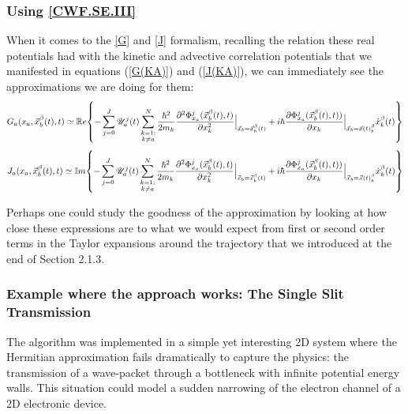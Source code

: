 \documentclass[11pt, a4paper]{article} %
\newcommand{\R}{\mathbb{R}} %
\newcommand{\U}{\mathscr{U}}
\begin{document}

\subsubsection{Using \ref{CWF.SE.III}}
When it comes to the \ref{G} and \ref{J} formalism, recalling the relation these real potentials had with the kinetic and advective correlation potentials that we manifested in equations (\ref{G(KA)}) and (\ref{J(KA)}), we can immediately see the approximations we are doing for them:
$$
G_a(x_a,\vec{x}_b^\beta(t),t)\simeq \R e \qty{ - \sum_{j=0}^J  \U^j_a(t) \sum_{\substack{k=1; \\ k\neq a}}^{N}  \frac{\hbar^2}{2m_k} \pdv[2]{ \Phi_{x_a}^j(\vec{x}_b^\beta(t),t)}{x_k}\Big\rvert_{\vec{x}_b=\vec{x}_b^\beta(t)} +  i \hbar \pdv{ \Phi_{x_a}^j(\vec{x}_b^\beta(t),t))}{x_k}\Big\rvert_{\vec{x}_b=\vec{x}(t)_b^\beta} \dot{x}_k^\beta(t)}
$$
$$
J_a(x_a,\vec{x}_b^\beta(t),t)\simeq \mathbb{I} m \qty{ - \sum_{j=0}^J  \U^j_a(t) \sum_{\substack{k=1; \\ k\neq a}}^{N}  \frac{\hbar^2}{2m_k} \pdv[2]{ \Phi_{x_a}^j(\vec{x}_b^\beta(t),t)}{x_k}\Big\rvert_{\vec{x}_b=\vec{x}_b^\beta(t)} +  i \hbar \pdv{ \Phi_{x_a}^j(\vec{x}_b^\beta(t),t))}{x_k}\Big\rvert_{\vec{x}_b=\vec{x}(t)_b^\beta} \dot{x}_k^\beta(t)}
$$

Perhaps one could study the goodness of the approximation by looking at how close these expressions are to what we would expect from first or second order terms in the Taylor expansions around the trajectory that we introduced at the end of Section 2.1.3.


\subsubsection{Example where the approach works: The Single Slit Transmission}
The algorithm was implemented in a simple yet interesting 2D system where the Hermitian approximation fails dramatically to capture the physics: the transmission of a wave-packet through a bottleneck with infinite potential energy walls. This situation could model a sudden narrowing of the electron channel of a 2D electronic device.
\end{document}
